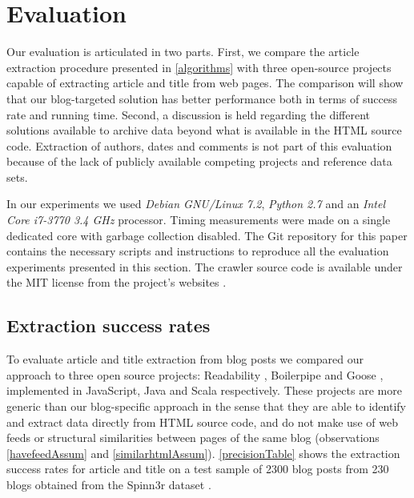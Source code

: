 \section{Evaluation}\label{evaluation}

Our evaluation is articulated in two parts. First, we compare the article extraction procedure presented in \autoref{algorithms} with three open-source projects capable of extracting article and title from web pages. The comparison will show that our blog-targeted solution has better performance both in terms of success rate and running time. Second, a discussion is held regarding the different solutions available to archive data beyond what is available in the HTML source code. Extraction of authors, dates and comments is not part of this evaluation because of the lack of publicly available competing projects and reference data sets.

In our experiments we used \emph{Debian GNU/Linux 7.2}, \emph{Python 2.7} and an \emph{Intel Core i7-3770 3.4 GHz} processor. Timing measurements were made on a single dedicated core with garbage collection disabled. The Git repository for this paper \cite{repositoryofthispaper} contains the necessary scripts and instructions to reproduce all the evaluation experiments presented in this section. The crawler source code is available under the MIT license from the project's websites \cite{blogforevercrawler}.

\subsection{Extraction success rates}
To evaluate article and title extraction from blog posts we compared our approach to three open source projects: Readability \cite{python-readability2011}, Boilerpipe \cite{kohlschuetter2010} and Goose \cite{goose2012}, implemented in JavaScript, Java and Scala respectively. These projects are more generic than our blog-specific approach in the sense that they are able to identify and extract data directly from HTML source code, and do not make use of web feeds or structural similarities between pages of the same blog (observations \ref{havefeedAssum} and \ref{similarhtmlAssum}). \autoref{precisionTable} shows the extraction success rates for article and title on a test sample of 2300 blog posts from 230 blogs obtained from the Spinn3r dataset \cite{burton2011}.


